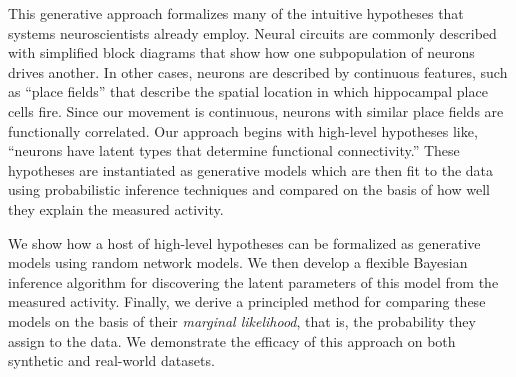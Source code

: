 This generative approach formalizes many of the intuitive hypotheses that systems neuroscientists already employ. 
Neural circuits are commonly described with simplified block diagrams that show how one subpopulation of neurons drives another. 
In other cases, neurons are described by continuous features, such as ``place fields'' that describe the spatial location in which hippocampal place cells fire.
Since our movement is continuous, neurons with similar place fields are functionally correlated.
Our approach begins with high-level hypotheses like, ``neurons have latent types that determine functional connectivity.''
These hypotheses are instantiated as generative models which are then fit to the data using probabilistic inference techniques and compared on the basis of how well they explain the measured activity.

We show how a host of high-level hypotheses can be formalized as generative models using random network models. 
We then develop a flexible Bayesian inference algorithm for discovering the latent parameters of this model from the measured activity. 
Finally, we derive a principled method for comparing these models on the basis of their \textit{marginal likelihood}, that is, the probability they assign to the data. 
We demonstrate the efficacy of this approach on both synthetic and real-world datasets. 



